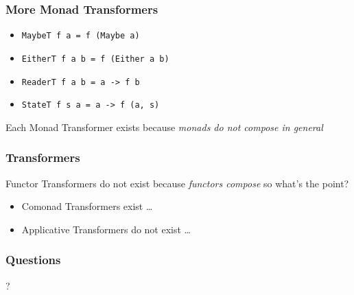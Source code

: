 \begin{frame}[fragile]
\frametitle{More Monad Transformers}
\begin{itemize}
  \item \lstinline $MaybeT f a = f (Maybe a)$
  \item \lstinline $EitherT f a b = f (Either a b)$
  \item \lstinline $ReaderT f a b = a -> f b$
  \item \lstinline $StateT f s a = a -> f (a, s)$
\end{itemize}
\begin{block}{Each Monad Transformer exists}
because \emph{monads do not compose in general}
\end{block}
\end{frame}

\begin{frame}[fragile]
\frametitle{Transformers}
\begin{block}{Functor Transformers do not exist}
because \emph{functors compose} so what's the point?
\end{block}
\begin{itemize}
\item Comonad Transformers exist \ldots
\item Applicative Transformers do not exist \ldots
\end{itemize}
\end{frame}

\begin{frame}[fragile]
\frametitle{Questions}
?
\end{frame}
